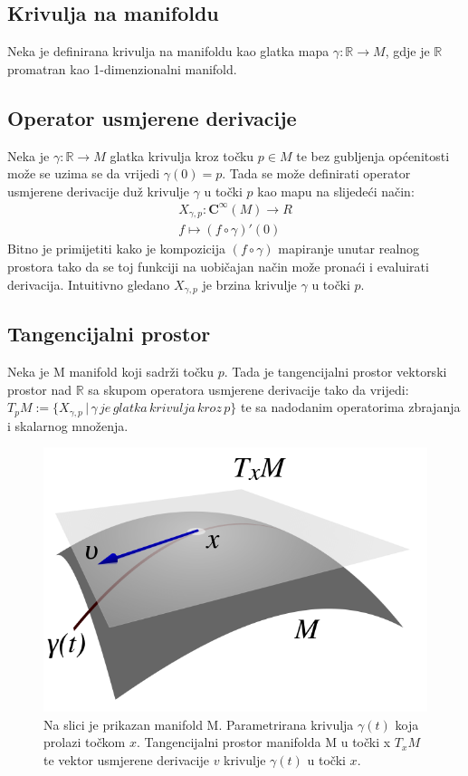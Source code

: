 \documentclass[times, utf8, diplomski, numeric]{fer}
\begin{document}
	\subsection{Krivulja na manifoldu} Neka je definirana krivulja na manifoldu kao glatka mapa $\gamma:\mathbb{R} \rightarrow M$, gdje je $\mathbb{R}$ promatran kao 1-dimenzionalni manifold.
	
	\subsection{Operator usmjerene derivacije} Neka je $\gamma: \mathbb{R} \rightarrow M$ glatka krivulja kroz točku $p\in M$ te bez gubljenja općenitosti može se uzima se da vrijedi $\gamma(0) = p$. Tada se može definirati operator usmjerene derivacije duž krivulje $\gamma$ u točki $p$ kao mapu na slijedeći način: \\
	\begin{gather}
		X_{\gamma, p} : \boldsymbol{C}^\infty(M) \rightarrow R \\
		f \mapsto (f \circ \gamma)'(0)
	\end{gather}
	Bitno je primijetiti kako je kompozicija $(f \circ \gamma)$ mapiranje unutar realnog prostora tako da se toj funkciji na uobičajan način može pronaći i evaluirati derivacija.
	Intuitivno gledano $X_{\gamma, p}$ je brzina krivulje $\gamma$ u točki $p$.
	
	\subsection{Tangencijalni prostor} Neka je M manifold koji sadrži točku $p$. Tada je tangencijalni prostor vektorski prostor nad $\mathbb{R}$ sa skupom operatora usmjerene derivacije tako da vrijedi: \\
	$T_p M := \{ X_{\gamma, p} \, | \, \gamma \, je \, glatka \, krivulja \, kroz \, p\}$ te sa nadodanim operatorima zbrajanja i skalarnog množenja.
	
	\begin{figure}[h!]
		\includegraphics[width=\textwidth]{figures/txm.png}
		\caption{Na slici je prikazan manifold M. Parametrirana krivulja $\gamma(t)$ koja prolazi točkom $x$. Tangencijalni prostor manifolda M u točki x $T_x M$ te vektor usmjerene derivacije $v$ krivulje $\gamma (t)$ u točki $x$. }
	\end{figure}
	
\end{document}
